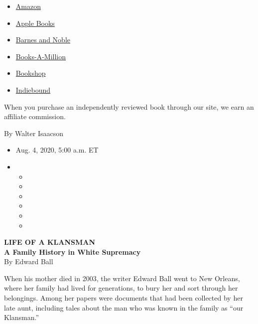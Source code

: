 \begin{itemize}
\tightlist
\item
  \href{https://www.amazon.com/gp/search?index=books\&tag=NYTBSREV-20\&field-keywords=Life+of+a+Klansman\%3A+A+Family+History+in+White+Supremacy+Edward+Ball}{Amazon}
\item
  \href{https://du-gae-books-dot-nyt-du-prd.appspot.com/buy?title=Life+of+a+Klansman\%3A+A+Family+History+in+White+Supremacy\&author=Edward+Ball}{Apple
  Books}
\item
  \href{https://www.anrdoezrs.net/click-7990613-11819508?url=https\%3A\%2F\%2Fwww.barnesandnoble.com\%2Fw\%2F\%3Fean\%3D9780374186326}{Barnes
  and Noble}
\item
  \href{https://www.anrdoezrs.net/click-7990613-35140?url=https\%3A\%2F\%2Fwww.booksamillion.com\%2Fp\%2FLife\%2Bof\%2Ba\%2BKlansman\%253A\%2BA\%2BFamily\%2BHistory\%2Bin\%2BWhite\%2BSupremacy\%2FEdward\%2BBall\%2F9780374186326}{Books-A-Million}
\item
  \href{https://bookshop.org/a/3546/9780374186326}{Bookshop}
\item
  \href{https://www.indiebound.org/book/9780374186326?aff=NYT}{Indiebound}
\end{itemize}

When you purchase an independently reviewed book through our site, we
earn an affiliate commission.

By Walter Isaacson

\begin{itemize}
\item
  Aug. 4, 2020, 5:00 a.m. ET
\item
  \begin{itemize}
  \item
  \item
  \item
  \item
  \item
  \item
  \end{itemize}
\end{itemize}

\textbf{LIFE OF A KLANSMAN}\\
\textbf{A Family History in White Supremacy}\\
By Edward Ball

When his mother died in 2003, the writer Edward Ball went to New
Orleans, where her family had lived for generations, to bury her and
sort through her belongings. Among her papers were documents that had
been collected by her late aunt, including tales about the man who was
known in the family as ``our Klansman.''

